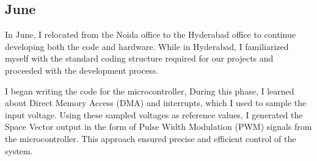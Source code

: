 \subsection{June}
In June, I relocated from the Noida office to the Hyderabad office to continue
developing both the code and hardware. While in Hyderabad, I familiarized
myself with the standard coding structure required for our projects and
proceeded with the development process.

I began writing the code for the microcontroller, During this phase, I learned
about Direct Memory Access (DMA) and interrupts, which I used to sample the
input voltage. Using these sampled voltages as reference values, I generated
the Space Vector output in the form of Pulse Width Modulation (PWM) signals
from the microcontroller. This approach ensured precise and efficient control
of the system.